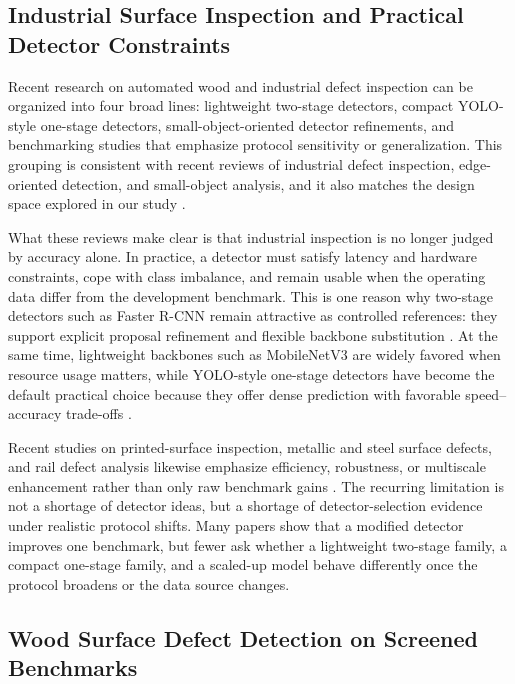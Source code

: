 \subsection{Industrial Surface Inspection and Practical Detector Constraints}

Recent research on automated wood and industrial defect inspection can be organized into four broad lines: lightweight two-stage detectors, compact YOLO-style one-stage detectors, small-object-oriented detector refinements, and benchmarking studies that emphasize protocol sensitivity or generalization. This grouping is consistent with recent reviews of industrial defect inspection, edge-oriented detection, and small-object analysis, and it also matches the design space explored in our study \citep{ma_2024_air,wang_2025_ieeeaccess,mittal_2024,wei_2024_smallreview,hua_2025_smallsurvey}.

What these reviews make clear is that industrial inspection is no longer judged by accuracy alone. In practice, a detector must satisfy latency and hardware constraints, cope with class imbalance, and remain usable when the operating data differ from the development benchmark. This is one reason why two-stage detectors such as Faster R-CNN remain attractive as controlled references: they support explicit proposal refinement and flexible backbone substitution \citep{faster_rcnn}. At the same time, lightweight backbones such as MobileNetV3 are widely favored when resource usage matters, while YOLO-style one-stage detectors have become the default practical choice because they offer dense prediction with favorable speed--accuracy trade-offs \citep{mobilenetv3,mittal_2024}.

Recent studies on printed-surface inspection, metallic and steel surface defects, and rail defect analysis likewise emphasize efficiency, robustness, or multiscale enhancement rather than only raw benchmark gains \citep{cmc_printed_positive,cmc_channel_shuffle,cmc_lmvit,cmc_msese,cmc_rail_upernet}. The recurring limitation is not a shortage of detector ideas, but a shortage of detector-selection evidence under realistic protocol shifts. Many papers show that a modified detector improves one benchmark, but fewer ask whether a lightweight two-stage family, a compact one-stage family, and a scaled-up model behave differently once the protocol broadens or the data source changes.

\subsection{Wood Surface Defect Detection on Screened Benchmarks}

